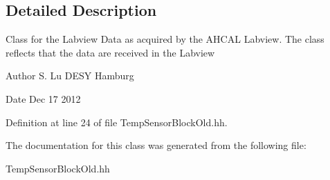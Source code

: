 \subsection{Detailed Description}
Class for the Labview Data as acquired by the AHCAL Labview. The class reflects that the data are received in the Labview \begin{DoxyAuthor}{Author}
S. Lu DESY Hamburg 
\end{DoxyAuthor}
\begin{DoxyDate}{Date}
Dec 17 2012 
\end{DoxyDate}


Definition at line 24 of file TempSensorBlockOld.hh.

The documentation for this class was generated from the following file:\begin{DoxyCompactItemize}
\item 
TempSensorBlockOld.hh\end{DoxyCompactItemize}
